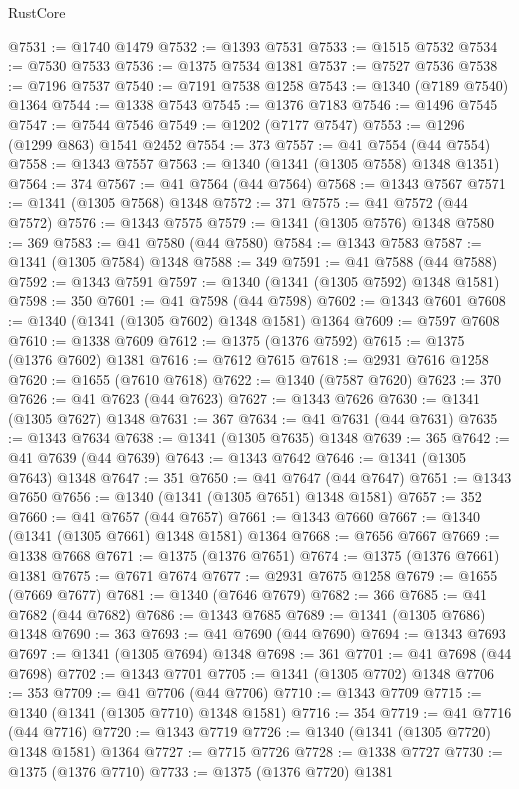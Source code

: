 \begin{lexlean}{RustCore}
\begin{coremodule}
@7531 := @1740 @1479
@7532 := @1393 @7531
@7533 := @1515 @7532
@7534 := @7530 @7533
@7536 := @1375 @7534 @1381
@7537 := @7527 @7536
@7538 := @7196 @7537
@7540 := @7191 @7538 @1258
@7543 := @1340 (@7189 @7540) @1364
@7544 := @1338 @7543
@7545 := @1376 @7183
@7546 := @1496 @7545
@7547 := @7544 @7546
@7549 := @1202 (@7177 @7547)
@7553 := @1296 (@1299 @863) @1541 @2452
@7554 := 373
@7557 := @41 @7554 (@44 @7554)
@7558 := @1343 @7557
@7563 := @1340 (@1341 (@1305 @7558) @1348 @1351)
@7564 := 374
@7567 := @41 @7564 (@44 @7564)
@7568 := @1343 @7567
@7571 := @1341 (@1305 @7568) @1348
@7572 := 371
@7575 := @41 @7572 (@44 @7572)
@7576 := @1343 @7575
@7579 := @1341 (@1305 @7576) @1348
@7580 := 369
@7583 := @41 @7580 (@44 @7580)
@7584 := @1343 @7583
@7587 := @1341 (@1305 @7584) @1348
@7588 := 349
@7591 := @41 @7588 (@44 @7588)
@7592 := @1343 @7591
@7597 := @1340 (@1341 (@1305 @7592) @1348 @1581)
@7598 := 350
@7601 := @41 @7598 (@44 @7598)
@7602 := @1343 @7601
@7608 := @1340 (@1341 (@1305 @7602) @1348 @1581) @1364
@7609 := @7597 @7608
@7610 := @1338 @7609
@7612 := @1375 (@1376 @7592)
@7615 := @1375 (@1376 @7602) @1381
@7616 := @7612 @7615
@7618 := @2931 @7616 @1258
@7620 := @1655 (@7610 @7618)
@7622 := @1340 (@7587 @7620)
@7623 := 370
@7626 := @41 @7623 (@44 @7623)
@7627 := @1343 @7626
@7630 := @1341 (@1305 @7627) @1348
@7631 := 367
@7634 := @41 @7631 (@44 @7631)
@7635 := @1343 @7634
@7638 := @1341 (@1305 @7635) @1348
@7639 := 365
@7642 := @41 @7639 (@44 @7639)
@7643 := @1343 @7642
@7646 := @1341 (@1305 @7643) @1348
@7647 := 351
@7650 := @41 @7647 (@44 @7647)
@7651 := @1343 @7650
@7656 := @1340 (@1341 (@1305 @7651) @1348 @1581)
@7657 := 352
@7660 := @41 @7657 (@44 @7657)
@7661 := @1343 @7660
@7667 := @1340 (@1341 (@1305 @7661) @1348 @1581) @1364
@7668 := @7656 @7667
@7669 := @1338 @7668
@7671 := @1375 (@1376 @7651)
@7674 := @1375 (@1376 @7661) @1381
@7675 := @7671 @7674
@7677 := @2931 @7675 @1258
@7679 := @1655 (@7669 @7677)
@7681 := @1340 (@7646 @7679)
@7682 := 366
@7685 := @41 @7682 (@44 @7682)
@7686 := @1343 @7685
@7689 := @1341 (@1305 @7686) @1348
@7690 := 363
@7693 := @41 @7690 (@44 @7690)
@7694 := @1343 @7693
@7697 := @1341 (@1305 @7694) @1348
@7698 := 361
@7701 := @41 @7698 (@44 @7698)
@7702 := @1343 @7701
@7705 := @1341 (@1305 @7702) @1348
@7706 := 353
@7709 := @41 @7706 (@44 @7706)
@7710 := @1343 @7709
@7715 := @1340 (@1341 (@1305 @7710) @1348 @1581)
@7716 := 354
@7719 := @41 @7716 (@44 @7716)
@7720 := @1343 @7719
@7726 := @1340 (@1341 (@1305 @7720) @1348 @1581) @1364
@7727 := @7715 @7726
@7728 := @1338 @7727
@7730 := @1375 (@1376 @7710)
@7733 := @1375 (@1376 @7720) @1381

\end{coremodule}
\end{lexlean}
